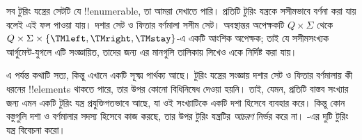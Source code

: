 \documentclass[../../../include/open-logic-section]{subfiles}
\begin{document}

\begin{explain}
সব টুরিং যন্ত্রের সেটটি যে !!{enumerable}, তা আমরা দেখাতে পারি। প্রতিটি
টুরিং যন্ত্রকে সসীমভাবে বর্ণনা করা যায় বলেই এই ফল পাওয়া যায়। দশার সেট ও
ফিতার বর্ণমালা সসীম সেট। অবস্থান্তর অপেক্ষকটি $Q \times \Sigma$ থেকে
$Q \times \Sigma \times \{\TMleft, \TMright, \TMstay\}$-এ একটি আংশিক
অপেক্ষক; তাই যে সসীমসংখ্যক আর্গুমেন্ট-যুগলে এটি সংজ্ঞায়িত, তাদের জন্য এর
মানগুলি তালিকায় লিখেও একে নির্দিষ্ট করা যায়।

এ পর্যন্ত কথাটি সত্য, কিন্তু এখানে একটি সূক্ষ্ম পার্থক্য আছে। টুরিং
যন্ত্রের সংজ্ঞায় দশার সেট ও ফিতার বর্ণমালায় কী ধরনের !!{element}s থাকতে
পারে, তার উপর কোনো বিধিনিষেধ দেওয়া হয়নি। তাই, যেমন, প্রতিটি বাস্তব
সংখ্যার জন্য এমন একটি টুরিং যন্ত্র প্রযুক্তিগতভাবে আছে, যা ওই সংখ্যাটিকে
একটি দশা হিসেবে ব্যবহার করে। কিন্তু কোন বস্তুগুলি দশা ও বর্ণমালার সদস্য
হিসেবে কাজ করছে, তার উপর টুরিং যন্ত্রটির \emph{আচরণ} নির্ভর করে না।
-এর দুটি টুরিং যন্ত্র বিবেচনা করো।
\begin{figure}
\begin{center}
\\
\end{center}
\end{figure}
\end{explain}
\end{document}
